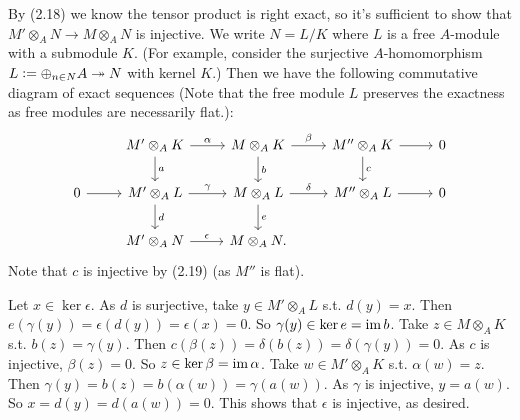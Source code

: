 \documentclass[../A&M.tex]{subfiles}
\begin{document}
By (2.18) we know the tensor product is right exact, so it's sufficient to show that $M' \otimes_A N \to M \otimes_A N$ is injective. We write $N=L/K$ where $L$ is a free $A$-module with a submodule $K$. (For example, consider the surjective $A$-homomorphism $L := \oplus_{n\in N} A \twoheadrightarrow N$ with kernel $K$.) Then we have the following commutative diagram of exact sequences (Note that the free module $L$ preserves the exactness as free modules are necessarily flat.):
$$
\begin{tikzcd}
	& M' \otimes_A K \arrow[r, "\alpha"] \arrow[d, "a"] & M \otimes_A K \arrow[r, "\beta"] \arrow[d, "b"] & M'' \otimes_A K \arrow{r} \arrow[d, "c"] & 0 \\ 
0 \arrow{r} & M' \otimes_A L \arrow[r, "\gamma"] \arrow[d, "d"] & M \otimes_A L \arrow[r, "\delta"] \arrow[d, "e"] & M'' \otimes_A L \arrow[r] & 0 \\
	& M' \otimes_A N \arrow[r, "\epsilon"] & M \otimes_A N. & &
\end{tikzcd}
$$
Note that $c$ is injective by (2.19) (as $M''$ is flat).

Let $x \in \ker \epsilon$. As $d$ is surjective, take $y \in M' \otimes_A L$ s.t. $d(y)=x$. Then $e(\gamma(y)) = \epsilon(d(y)) = \epsilon(x) = 0$. So $\gamma(y) \in \ker e = \operatorname{im} b$. Take $z \in M \otimes_A K$ s.t. $b(z)=\gamma(y)$. Then $c(\beta(z)) = \delta(b(z)) = \delta(\gamma(y)) = 0$. As $c$ is injective, $\beta(z)=0$. So $z\in \ker \beta = \operatorname{im} \alpha$. Take $w\in M' \otimes_A K$ s.t. $\alpha(w) = z$. Then $\gamma(y) = b(z) = b(\alpha(w)) = \gamma(a(w))$. As $\gamma$ is injective, $y=a(w)$. So $x = d(y) = d(a(w)) = 0$. This shows that $\epsilon$ is injective, as desired.
\end{document}
